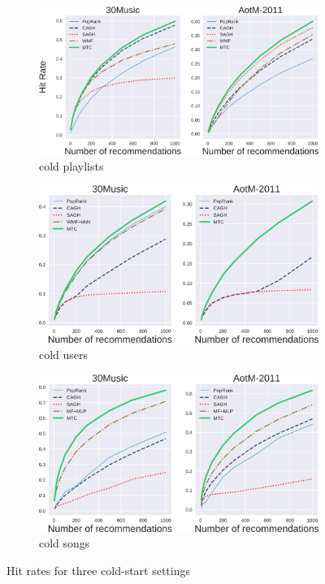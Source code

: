 \begin{figure}[!t]
    \centering
    \begin{subfigure}[t]{\columnwidth}
        \centering
        \includegraphics[width=\columnwidth]{fig/hr3.png}
        \caption{cold playlists}
    \end{subfigure}
    \begin{subfigure}[t]{\columnwidth}
        \centering
        \includegraphics[width=\columnwidth]{fig/hr4.png}
        \caption{cold users}
    \end{subfigure}
    \begin{subfigure}[t]{\columnwidth}
        \centering
        \includegraphics[width=\columnwidth]{fig/hr1.png}
        \caption{cold songs}
    \end{subfigure}
    \caption{Hit rates for three cold-start settings}
\end{figure}
